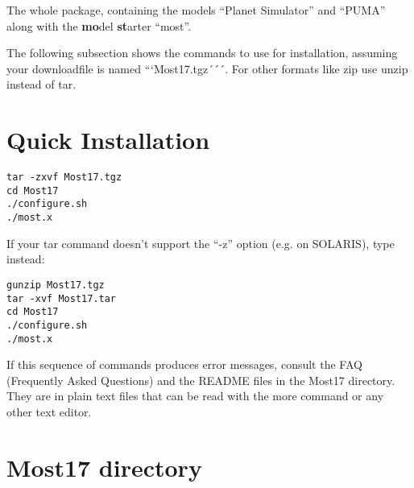 The whole package, containing the models ``Planet Simulator'' and ``PUMA''
along with the {\bf mo}del {\bf st}arter ``most''.

The following subsection shows the commands to use for installation,
assuming your downloadfile is named ```Most17.tgz´´´. For other
formats like zip use unzip instead of tar.

\section{Quick Installation}

\begin{verbatim}
tar -zxvf Most17.tgz
cd Most17
./configure.sh
./most.x
\end{verbatim}

If your tar command doesn't support the ``-z'' option (e.g. on SOLARIS),
type instead:

\begin{verbatim}
gunzip Most17.tgz
tar -xvf Most17.tar
cd Most17
./configure.sh
./most.x
\end{verbatim}

If this sequence of commands produces error messages,
consult the FAQ (Frequently Asked Questions) and the README files
in the Most17 directory. They are in plain text files that can be read with
the more command or any other text editor.

\section{Most17 directory }

